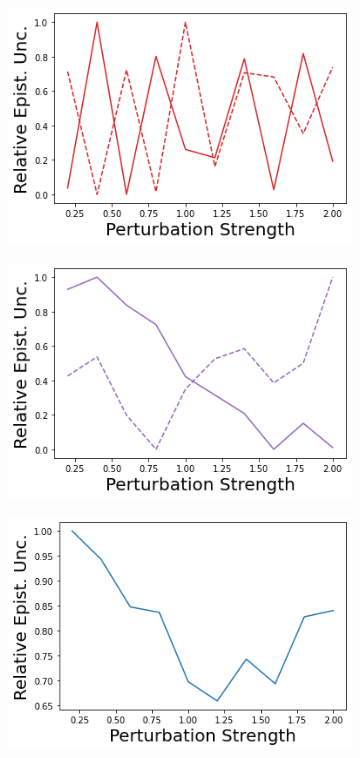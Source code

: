 \begin{figure}
    \begin{subfigure}{.24\textwidth}
        \includegraphics[width=\textwidth]{sections/011_icml2022/resources/action_shift-DropOut-CartPoleShift-v0-mean_epistemic_uncertainty_.png}
    \end{subfigure}
    \begin{subfigure}{.24\textwidth}
        \includegraphics[width=\textwidth]{sections/011_icml2022/resources/action_shift-Ensemble-CartPoleShift-v0-mean_epistemic_uncertainty_.png}
    \end{subfigure}
    \begin{subfigure}{.24\textwidth}
        \includegraphics[width=\textwidth]{sections/011_icml2022/resources/action_shift-DKL-CartPoleShift-v0-mean_epistemic_uncertainty_.png}

\end{subfigure}
\end{figure}
